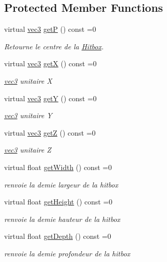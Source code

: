 \subsection*{Protected Member Functions}
\begin{DoxyCompactItemize}
\item 
virtual \hyperlink{structvec3}{vec3} \hyperlink{class_hitbox_a2572250e152f89c05e68f9fb0a03bf7a}{get\+P} () const =0
\begin{DoxyCompactList}\small\item\em Retourne le centre de la \hyperlink{class_hitbox}{Hitbox}. \end{DoxyCompactList}\item 
virtual \hyperlink{structvec3}{vec3} \hyperlink{class_hitbox_a25ee2fb5e0556399bc8012073e461411}{get\+X} () const =0
\begin{DoxyCompactList}\small\item\em \hyperlink{structvec3}{vec3} unitaire X \end{DoxyCompactList}\item 
virtual \hyperlink{structvec3}{vec3} \hyperlink{class_hitbox_acf6cfd480e5e1d925386a1225713ea13}{get\+Y} () const =0
\begin{DoxyCompactList}\small\item\em \hyperlink{structvec3}{vec3} unitaire Y \end{DoxyCompactList}\item 
virtual \hyperlink{structvec3}{vec3} \hyperlink{class_hitbox_a2a024cefac26e2fb8db4ecc9010251c8}{get\+Z} () const =0
\begin{DoxyCompactList}\small\item\em \hyperlink{structvec3}{vec3} unitaire Z \end{DoxyCompactList}\item 
virtual float \hyperlink{class_hitbox_a5805a4ad2b59f303892af5dfca73a41e}{get\+Width} () const =0
\begin{DoxyCompactList}\small\item\em renvoie la demie largeur de la hitbox \end{DoxyCompactList}\item 
virtual float \hyperlink{class_hitbox_a2393fb817af93cbeacfb140f4f30c1a0}{get\+Height} () const =0
\begin{DoxyCompactList}\small\item\em renvoie la demie hauteur de la hitbox \end{DoxyCompactList}\item 
virtual float \hyperlink{class_hitbox_a100e9cdbd7e85179e64c9679c28354ee}{get\+Depth} () const =0
\begin{DoxyCompactList}\small\item\em renvoie la demie profondeur de la hitbox \end{DoxyCompactList}\end{DoxyCompactItemize}
